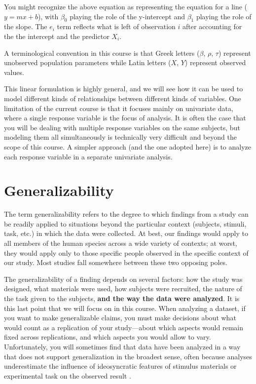 \documentclass[]{book}
\begin{document}
You might recognize the above equation as representing the equation for a line (\(y = mx + b\)), with \(\beta_0\) playing the role of the y-intercept and \(\beta_1\) playing the role of the slope. The \(e_i\) term reflects what is left of observation \(i\) after accounting for the the intercept and the predictor \(X_i\).

A terminological convention in this course is that Greek letters (\(\beta\), \(\rho\), \(\tau\)) represent unobserved population parameters while Latin letters (\(X\), \(Y\)) represent observed values.

This linear formulation is highly general, and we will see how it can be used to model different kinds of relationships between different kinds of variables. One limitation of the current course is that it focuses mainly on univariate data, where a single response variable is the focus of analysis. It is often the case that you will be dealing with multiple response variables on the same subjects, but modeling them all simultaneously is technically very difficult and beyond the scope of this course. A simpler approach (and the one adopted here) is to analyze each response variable in a separate univariate analysis.

\hypertarget{generalizability}{%
\section{Generalizability}\label{generalizability}}

The term generalizability refers to the degree to which findings from a study can be readily applied to situations beyond the particular context (subjects, stimuli, task, etc.) in which the data were collected. At best, our findings would apply to all members of the human species across a wide variety of contexts; at worst, they would apply only to those specific people observed in the specific context of our study. Most studies fall somewhere between these two opposing poles.

The generalizability of a finding depends on several factors: how the study was designed, what materials were used, how subjects were recruited, the nature of the task given to the subjects, \textbf{and the way the data were analyzed}. It is this last point that we will focus on in this course. When analyzing a dataset, if you want to make generalizable claims, you must make decisions about what would count as a replication of your study---about which aspects would remain fixed across replications, and which aspects you would allow to vary. Unfortunately, you will sometimes find that data have been analyzed in a way that does not support generalization in the broadest sense, often because analyses underestimate the influence of ideosyncratic features of stimulus materials or experimental task on the observed result \citep{yarkoni_2019}.
\end{document}
